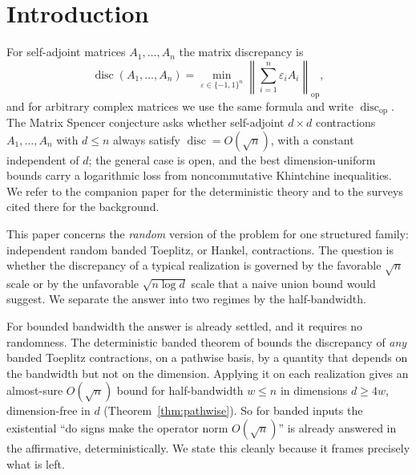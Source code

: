 \documentclass[11pt]{amsart}
\numberwithin{equation}{section}
\theoremstyle{definition}
\theoremstyle{remark}
\newcommand{\op}{\mathrm{op}}
\newcommand{\disc}{\operatorname{disc}}
\newcommand{\discop}{\operatorname{disc}_{\op}}
\newcommand{\norm}[1]{\left\lVert #1\right\rVert}
\newcommand{\eps}{\varepsilon}
\begin{document}
\maketitle

\section{Introduction}

For self-adjoint matrices $A_1,\ldots,A_n$ the matrix discrepancy is
\[
\disc(A_1,\ldots,A_n)=\min_{\eps\in\{-1,1\}^n}\norm{\sum_{i=1}^n\eps_iA_i}_{\op},
\]
and for arbitrary complex matrices we use the same formula and write $\discop$.
The Matrix Spencer conjecture asks whether self-adjoint $d\times d$ contractions
$A_1,\ldots,A_n$ with $d\le n$ always satisfy $\disc=O(\sqrt n)$, with a constant
independent of $d$; the general case is open, and the best dimension-uniform
bounds carry a logarithmic loss from noncommutative Khintchine inequalities. We
refer to the companion paper \cite{Shmalo-paper12} for the deterministic theory
and to the surveys cited there for the background.

This paper concerns the \emph{random} version of the problem for one structured
family: independent random banded Toeplitz, or Hankel, contractions. The
question is whether the discrepancy of a typical realization is governed by the
favorable $\sqrt n$ scale or by the unfavorable $\sqrt{n\log d}$ scale that a
naive union bound would suggest. We separate the answer into two regimes by the
half-bandwidth.

For bounded bandwidth the answer is already settled, and it requires no
randomness. The deterministic banded theorem of \cite{Shmalo-paper12} bounds the
discrepancy of \emph{any} banded Toeplitz contractions, on a pathwise basis, by a
quantity that depends on the bandwidth but not on the dimension. Applying it on
each realization gives an almost-sure $O(\sqrt n)$ bound for half-bandwidth
$w\le n$ in dimensions \(d\ge4w\), dimension-free in $d$ (Theorem~\ref{thm:pathwise}). So for banded
inputs the existential ``do signs make the operator norm $O(\sqrt n)$'' is
already answered in the affirmative, deterministically. We state this cleanly
because it frames precisely what is left.
\end{document}
